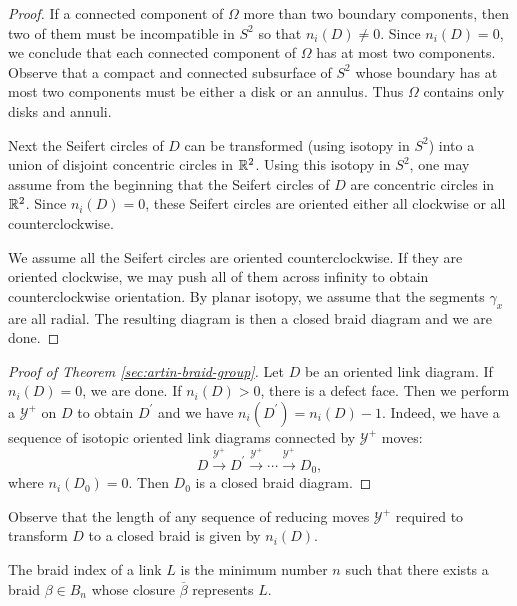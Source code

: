 \begin{proof}
  If a connected component of $\Omega$ more than two boundary components, then two of them must be incompatible in $S^2$ so that $n_i(D) \ne 0$. Since $n_i(D) = 0$, we conclude that each connected component of $\Omega$ has at most two components. Observe that a compact and connected subsurface of $S^2$ whose boundary has at most two components must be either a disk or an annulus. Thus $\Omega$ contains only disks and annuli.

  Next the Seifert circles of $D$ can be transformed (using isotopy in $S^2$) into a union of disjoint concentric circles in $\mathbb{R}^2$. Using this isotopy in $S^2$, one may assume from the beginning that the Seifert circles of $D$ are concentric circles in $\mathbb{R}^2$. Since $n_i(D)= 0$, these Seifert circles are oriented either all clockwise or all counterclockwise.

  We assume all the Seifert circles are oriented counterclockwise. If they are oriented clockwise, we may push all of them across infinity to obtain counterclockwise orientation. By planar isotopy, we assume that the segments $\gamma_x$ are all radial. The resulting diagram is then a closed braid diagram and we are done.
\end{proof}

\begin{proof}[Proof of Theorem \ref{sec:artin-braid-group}]
\label{sec:artin-braid-group-19}
  Let $D$ be an oriented link diagram. If $n_i(D) = 0$, we are done. If $n_i(D) > 0$, there is a defect face. Then we perform a $\mathcal{Y}^+$ on $D$ to obtain $D^{\prime}$ and we have $n_i(D^{\prime}) = n_i(D) - 1$. Indeed, we have a sequence of isotopic oriented link diagrams connected by $\mathcal{Y}^+$ moves: 
\begin{equation}
\label{eq:11}
D \xrightarrow{\mathcal{Y}^+} D^{\prime} \xrightarrow{\mathcal{Y}^+} \cdots \xrightarrow{\mathcal{Y}^+} D_0,
\end{equation}
where $n_i(D_0) = 0$. Then $D_0$ is a closed braid diagram.
\end{proof}

\begin{remark}
\label{sec:artin-braid-group-20}
Observe that the length of any sequence of reducing moves $\mathcal{Y}^+$ required to transform $D$ to a closed braid is given by $n_i(D)$.
\end{remark}

\begin{definition}
  The braid index of a link $L$ is the minimum number $n$ such that there exists a braid $\beta \in B_n$ whose closure $\overline{\beta}$ represents $L$.
\end{definition}

